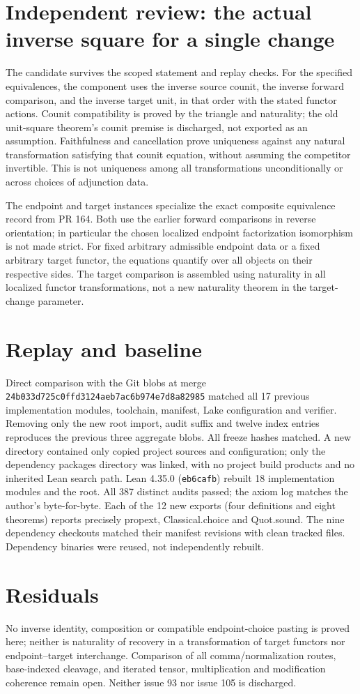 \documentclass{article}
\begin{document}
\section*{Independent review: the actual inverse square for a single change}
The candidate survives the scoped statement and replay checks. For the specified equivalences, the component uses the inverse source counit, the inverse forward comparison, and the inverse target unit, in that order with the stated functor actions. Counit compatibility is proved by the triangle and naturality; the old unit-square theorem's counit premise is discharged, not exported as an assumption. Faithfulness and cancellation prove uniqueness against any natural transformation satisfying that counit equation, without assuming the competitor invertible. This is not uniqueness among all transformations unconditionally or across choices of adjunction data.

The endpoint and target instances specialize the exact composite equivalence record from PR 164. Both use the earlier forward comparisons in reverse orientation; in particular the chosen localized endpoint factorization isomorphism is not made strict. For fixed arbitrary admissible endpoint data or a fixed arbitrary target functor, the equations quantify over all objects on their respective sides. The target comparison is assembled using naturality in all localized functor transformations, not a new naturality theorem in the target-change parameter.

\section*{Replay and baseline}
Direct comparison with the Git blobs at merge \texttt{24b033d725c0ffd3124aeb7ac6b974e7d8a82985} matched all 17 previous implementation modules, toolchain, manifest, Lake configuration and verifier. Removing only the new root import, audit suffix and twelve index entries reproduces the previous three aggregate blobs. All freeze hashes matched. A new directory contained only copied project sources and configuration; only the dependency packages directory was linked, with no project build products and no inherited Lean search path. Lean 4.35.0 (\texttt{eb6cafb}) rebuilt 18 implementation modules and the root. All 387 distinct audits passed; the axiom log matches the author's byte-for-byte. Each of the 12 new exports (four definitions and eight theorems) reports precisely propext, Classical.choice and Quot.sound. The nine dependency checkouts matched their manifest revisions with clean tracked files. Dependency binaries were reused, not independently rebuilt.

\section*{Residuals}
No inverse identity, composition or compatible endpoint-choice pasting is proved here; neither is naturality of recovery in a transformation of target functors nor endpoint--target interchange. Comparison of all comma/normalization routes, base-indexed cleavage, and iterated tensor, multiplication and modification coherence remain open. Neither issue 93 nor issue 105 is discharged.
\end{document}
